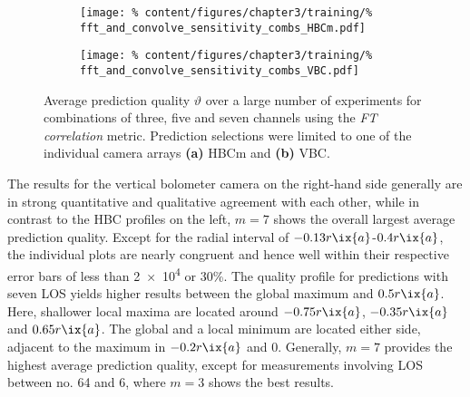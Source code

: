 %
        \begin{figure}[t]%
            \centering%
            \begin{subfigure}{0.47\textwidth}%
                \texttt{[image: \%
                    content/figures/chapter3/training/\%
                    fft\_and\_convolve\_sensitivity\_combs\_HBCm.pdf]}%
                \caption{}%
            \end{subfigure}%
            \hfill%
            \begin{subfigure}{0.47\textwidth}%
                \texttt{[image: \%
                    content/figures/chapter3/training/\%
                    fft\_and\_convolve\_sensitivity\_combs\_VBC.pdf]}%
                \caption{}%
            \end{subfigure}%
            \caption{Average prediction quality $\vartheta$ over a large number of experiments for combinations of three, five and seven channels using the \textit{FT correlation} metric. Prediction selections were limited to one of the individual camera arrays \textbf{(a)} HBCm and \textbf{(b)} VBC.}\label{fig:results_fourier_correlation}%
        \end{figure}%
%
        The results for the vertical bolometer camera on the right-hand side generally are in strong quantitative and qualitative agreement with each other, while in contrast to the HBC profiles on the left, $m=7$ shows the overall largest average prediction quality. Except for the radial interval of $-0.13r\ix{a}$-$0.4r\ix{a}$, the individual plots are nearly congruent and hence well within their respective error bars of less than \SI{2e4}{\arbitraryunit} or 30\%. The quality profile for predictions with seven LOS yields higher results between the global maximum and $0.5r\ix{a}$. Here, shallower local maxima are located around $-0.75r\ix{a}$, $-0.35r\ix{a}$ and $0.65r\ix{a}$. The global and a local minimum are located either side, adjacent to the maximum in $-0.2r\ix{a}$ and $0$. Generally, $m=7$ provides the highest average prediction quality, except for measurements involving LOS between no. 64 and 6, where $m=3$ shows the best results.\\%
